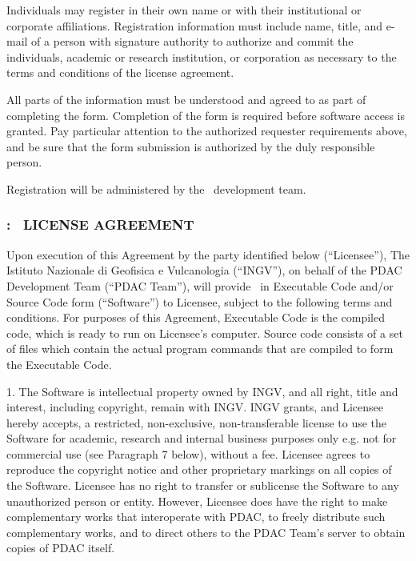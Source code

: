 Individuals may register in their own name or with their institutional or
corporate affiliations. Registration information must include name, title, 
and e-mail of a person with signature authority to authorize and commit the
individuals, academic or research institution, or corporation as necessary 
to the terms and conditions of the license agreement.

All parts of the information must be understood and agreed to as part of
completing the form. Completion of the form is required before software 
access is granted. Pay particular attention to the authorized requester 
requirements above, and be sure that the form submission is authorized 
by the duly responsible person.

Registration will be administered by the \PDAC\ development team.

\newpage
\subsubsection*{\PDAC: \PDACNAME\ LICENSE AGREEMENT}

Upon execution of this Agreement by the party identified below (``Licensee''),
The Istituto Nazionale di Geofisica e Vulcanologia (``INGV''), on 
behalf of the PDAC Development Team (``PDAC Team''),
will provide \PDAC\ in Executable 
Code and/or Source Code form (``Software'') to Licensee, subject to 
the following terms and conditions. For purposes of this Agreement, 
Executable Code is the compiled code, which is ready to run on Licensee's 
computer. Source code consists of a set of files which contain the 
actual program commands that are compiled to form the Executable Code.

1. The Software is intellectual property owned by INGV, and all 
right, title and interest, including copyright, remain with INGV. 
INGV grants, and Licensee hereby accepts, a restricted, non-exclusive, 
non-transferable license to use the Software for academic, research 
and internal business purposes only e.g. not for commercial use 
(see Paragraph 7 below), without a fee. Licensee agrees to reproduce 
the copyright notice and other proprietary markings on all copies of 
the Software. Licensee has no right to transfer or sublicense the 
Software to any unauthorized person or entity. However, Licensee does 
have the right to make complementary works that interoperate with PDAC, 
to freely distribute such complementary works, and to direct others 
to the PDAC Team's server to obtain copies of PDAC itself.

